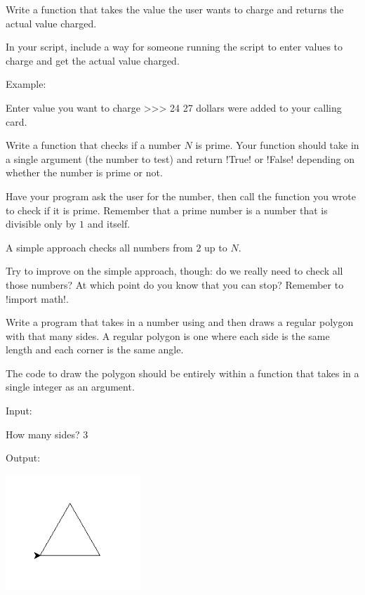 \documentclass[11pt]{cselabheader}
\begin{document}
{\begin{ex}[calls.py]
    Write a function that takes the value the user wants to charge and returns
    the actual value charged.

    In your script, include a way for someone running the script to enter values
    to charge and get the actual value charged.

    Example:

    \begin{verbatimcode}
Enter value you want to charge >>> 24
27 dollars were added to your calling card.
    \end{verbatimcode}
\end{ex}


\begin{ex}[primes.py] 
  Write a function that checks if a number $N$ is prime. Your function should
  take in a single argument (the number to test) and return \pythoninline!True!
  or \pythoninline!False! depending on whether the number is prime or not.

  Have your program ask the user for the number, then call the function you
  wrote to check if it is prime. Remember that a prime number is a
  number that is divisible only by $1$ and itself.
  
  A simple approach checks all numbers from $2$ up to $N$.

  Try to improve on the simple approach, though: do we really need to check
  all those numbers? At which point do you know that you can stop? Remember to
  \pythoninline!import math!.
\end{ex}


  \begin{ex}[polygons2.py] Write a program that takes in a number using
     and then draws a regular polygon with that many sides. A
    regular polygon is one where each side is the same length and each corner is
    the same angle.
    
    The code to draw the polygon should be entirely within a function that takes
    in a single integer as an argument.

    Input:

    \begin{verbatimcode}
How many sides? 3
    \end{verbatimcode}

    Output:
    \begin{center}
      \includegraphics[width=2.0in]{img/triangle}
    \end{center}
\end{ex}

}
\end{document}
